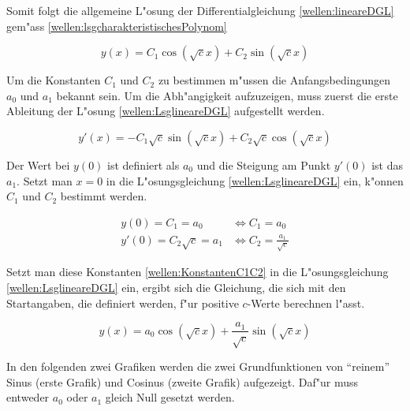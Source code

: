 Somit folgt die allgemeine L"osung der Differentialgleichung 
\ref{wellen:lineareDGL} gem"ass \ref{wellen:lsgcharakteristischesPolynom}

\begin{equation}
	y(x) = C_1 \cos(\sqrt{c}x) + C_2 \sin(\sqrt{c}x)
	\label{wellen:LsglineareDGL}
\end{equation}

Um die Konstanten $C_1$ und $C_2$ zu bestimmen m"ussen die Anfangsbedingungen 
$a_0$ und $a_1$ bekannt sein. Um die Abh"angigkeit aufzuzeigen, muss zuerst die 
erste Ableitung der L"osung \ref{wellen:LsglineareDGL} aufgestellt werden.

\begin{equation}
	y'(x)=-C_1 \sqrt{c} \sin(\sqrt{c}x) + C_2 \sqrt{c} \cos(\sqrt{c}x)
\end{equation}

Der Wert bei $y(0)$ ist definiert als $a_0$ und die Steigung am Punkt $y'(0)$ 
ist das $a_1$. Setzt man $x=0$ in die L"osungsgleichung 
\ref{wellen:LsglineareDGL} ein, k"onnen $C_1$ und $C_2$ bestimmt werden.

\begin{equation}
	\begin{split}
		y(0) = C_1 = a_0 &\Leftrightarrow C_1 = a_0 \\
		y'(0) = C_2 \sqrt{c} = a_1 &\Leftrightarrow C_2 = \frac{a_1}{\sqrt{c}}
	\end{split}
	\label{wellen:KonstantenC1C2}
\end{equation}

Setzt man diese Konstanten \ref{wellen:KonstantenC1C2} in die L"osungsgleichung 
\ref{wellen:LsglineareDGL} 
ein, ergibt sich die Gleichung, die sich mit den Startangaben, die definiert 
werden, f"ur positive $c$-Werte berechnen l"asst.

\begin{equation}
	y(x) = a_0 \cos(\sqrt{c}x) + \frac{a_1}{\sqrt{c}} \sin(\sqrt{c}x)
	\label{wellen:LSGleichung}
\end{equation}

In den folgenden zwei Grafiken werden die zwei Grundfunktionen von ``reinem''
Sinus (erste Grafik) und Cosinus (zweite Grafik) aufgezeigt. Daf"ur muss 
entweder $a_0$ oder $a_1$ gleich Null gesetzt werden.

